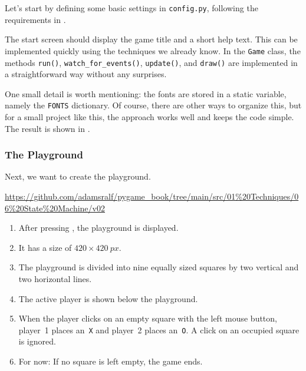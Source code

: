 Let's start by defining some basic settings in \texttt{config.py}, following the requirements in .


The start screen should display the game title and a short help text. This can be implemented quickly using the techniques we already know. In the \texttt{Game} class, the methods \texttt{run()}, \texttt{watch\_for\_events()}, \texttt{update()}, and \texttt{draw()} are implemented in a straightforward way without any surprises.

One small detail is worth mentioning: the fonts are stored in a static variable, namely the \texttt{FONTS} dictionary. Of course, there are other ways to organize this, but for a small project like this, the approach works well and keeps the code simple. The result is shown in .



\subsubsection{The Playground}

Next, we want to create the playground.
\begin{diskbox}
	\url{https://github.com/adamsralf/pygame_book/tree/main/src/01%20Techniques/06%20State%20Machine/v02}
\end{diskbox}

\begin{enumerate}
	\item After pressing , the playground is displayed.\label{reqTicTacToePlaygroundStart}
	
	\item It has a size of $420\times \SI{420}{px}$.\label{reqTicTacToePlaygroundSize}
	
	\item The playground is divided into nine equally sized squares by two vertical and two horizontal lines.\label{reqTicTacToePlaygroundGrid}
	
	\item The active player is shown below the playground.\label{reqTicTacToePlaygroundActivPlayer}
	
	\item When the player clicks on an empty square with the left mouse button, player~1 places an~\texttt{X} and player~2 places an~\texttt{O}. A click on an occupied square is ignored.\label{reqTicTacToePlaygroundMove}
	
	\item For now: If no square is left empty, the game ends.\label{reqTicTacToePlaygroundFull}
\end{enumerate}
\er

